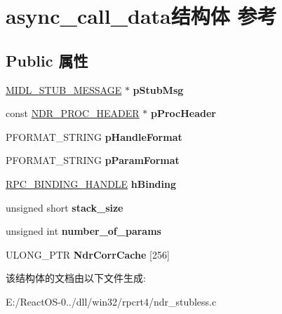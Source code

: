 \hypertarget{structasync__call__data}{}\section{async\+\_\+call\+\_\+data结构体 参考}
\label{structasync__call__data}
\subsection*{Public 属性}
\begin{DoxyCompactItemize}
\item 
\mbox{\label{structasync__call__data_a6a3150f5ef8ec490cd1b69b3160d26a5}} 
\hyperlink{struct___m_i_d_l___s_t_u_b___m_e_s_s_a_g_e}{M\+I\+D\+L\+\_\+\+S\+T\+U\+B\+\_\+\+M\+E\+S\+S\+A\+GE} $\ast$ {\bfseries p\+Stub\+Msg}
\item 
\mbox{\label{structasync__call__data_aceda98581a728df555383a09b0d95b0e}} 
const \hyperlink{struct___n_d_r___p_r_o_c___h_e_a_d_e_r}{N\+D\+R\+\_\+\+P\+R\+O\+C\+\_\+\+H\+E\+A\+D\+ER} $\ast$ {\bfseries p\+Proc\+Header}
\item 
\mbox{\label{structasync__call__data_aa6ce092d95b43f97e108a0c76bbc38be}} 
P\+F\+O\+R\+M\+A\+T\+\_\+\+S\+T\+R\+I\+NG {\bfseries p\+Handle\+Format}
\item 
\mbox{\label{structasync__call__data_aa9af15629f57b25e09eb3f37c69385a4}} 
P\+F\+O\+R\+M\+A\+T\+\_\+\+S\+T\+R\+I\+NG {\bfseries p\+Param\+Format}
\item 
\mbox{\label{structasync__call__data_a029e33cd0766b94164080079ed69ea5e}} 
\hyperlink{interfacevoid}{R\+P\+C\+\_\+\+B\+I\+N\+D\+I\+N\+G\+\_\+\+H\+A\+N\+D\+LE} {\bfseries h\+Binding}
\item 
\mbox{\label{structasync__call__data_a94c1d40dbf9bd0ae2d7162cdfed7efc1}} 
unsigned short {\bfseries stack\+\_\+size}
\item 
\mbox{\label{structasync__call__data_ac5d8333bc5d872d8a793b6bdfe078625}} 
unsigned int {\bfseries number\+\_\+of\+\_\+params}
\item 
\mbox{\label{structasync__call__data_ab7fb5ce30c8efb82887bead2052be248}} 
U\+L\+O\+N\+G\+\_\+\+P\+TR {\bfseries Ndr\+Corr\+Cache} \mbox{[}256\mbox{]}
\end{DoxyCompactItemize}


该结构体的文档由以下文件生成\+:\begin{DoxyCompactItemize}
\item 
E\+:/\+React\+O\+S-\/0../dll/win32/rpcrt4/ndr\+\_\+stubless.\+c\end{DoxyCompactItemize}
